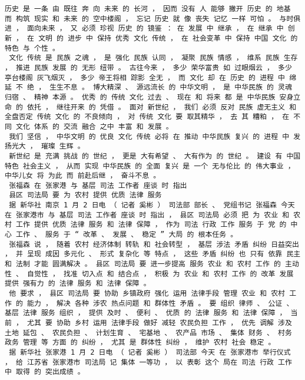\documentclass{article}
\begin{document}
\begin{Verbatim}[commandchars=\\\{\}]
 历史 是 一条 由 既往 奔 向 未来 的 长河 ， 因而 没有 人 能够 撇开 历史 的 地基 而 构筑 现实 和 未来 的 空中楼阁 ， 忘记 历史 就 像 丧失 记忆 一样 可怕 。 与时俱进 ， 面向未来 ， 又 必须 珍视 历史 的 镜鉴 ： 在 发展 中 继承 ， 在 继承 中 创新 ， 在 文明 的 进步 中 保持 优秀 文化 传统 ， 在 社会变革 中 保持 中国 文化 的 特色 与 个性 。 
 文化 传统 是 民族 之魂 ， 是 强化 民族 认同 ， 凝聚 民族 情感 ， 维系 民族 生存 ， 推进 民族 发展 的 无形 纽带 。 古往今来 ， 多少 荣华富贵 如 过眼烟云 ， 多少 亭台楼阁 灰飞烟灭 ， 多少 帝王将相 踪影 全无 ， 而 文化 却 在 历史 的 进程 中 绵延 不 绝 ， 生生不息 。 博大精深 、 源远流长 的 中华文明 ， 是 中华民族 的 灵魂 归宿 、 精神 本源 。 优秀 的 传统 文化 过去 、 现在 和 将来 都 是 中华民族 安身立命 的 依托 ， 继往开来 的 凭借 。 面对 新世纪 ， 我们 必须 反对 民族 虚无主义 和 全盘否定 传统 文化 的 不良倾向 ， 对 传统 文化 要 取其精华 ， 去 其 糟粕 ， 在 不同 文化 体系 的 交流 融合 之中 丰富 和 发展 。 
 我们 坚信 ， 中华文明 的 优良 文化 传统 必将 在 推动 中华民族 复兴 的 进程 中 发扬光大 ， 璀璨 生辉 。 
 新世纪 是 充满 挑战 的 世纪 ， 更是 大有希望 、 大有作为 的 世纪 。 建设 有 中国 特色 社会主义 ， 从而 实现 中华民族 的 全面 复兴 是 一个 无与伦比 的 伟大事业 ， 中华儿女 将 为此 而 前赴后继 ， 奋斗不息 。 
 张福森 在 张家港 与 基层 司法 工作者 座谈 时 指出 
 县区 司法局 要 为 农村 提供 优质 法律 服务 
 据 新华社 南京 1 月 2 日电 （ 记者 奚彬 ） 司法部 部长 、 党组书记 张福森 今天 在 张家港市 与 基层 司法 工作者 座谈 时 指出 ， 县区 司法局 必须 把 为 农业 和 农村 工作 提供 优质 法律 服务 和 法律 保障 ， 作为 司法 行政 工作 服务 于 党 的 中心 工作 、 服务 于 “ 改革 、 发展 、 稳定 ” 大局 的 根本任务 。 
 张福森 说 ， 随着 农村 经济体制 转轨 和 社会转型 ， 基层 涉法 矛盾 纠纷 日益突出 ， 并 呈现 成因 多元化 、 形式 复杂化 等 特点 ， 这些 矛盾 纠纷 也 只有 依靠 民主 和 法制 才能 圆满解决 。 县区 司法局 要 进一步提高 服务 农业 和 农村 工作 的 主动性 、 自觉性 ， 找准 切入点 和 结合点 ， 积极 为 农业 和 农村 工作 的 改革 发展 提供 强有力 的 法律 服务 和 法律 保障 。 
 他 要求 ， 县区 司法局 要 协助 乡镇政府 强化 运用 法律手段 管理 农业 和 农村 工作 的 能力 ， 解决 各种 涉农 热点问题 和 群体性 矛盾 。 要 组织 律师 、 公证 、 基层 法律 服务 组织 ， 提供 及时 、 便利 、 优质 的 法律 服务 和 法律 保障 ， 当前 ， 尤其 要 协助 乡村 运用 法律手段 做好 减轻 农民负担 工作 ， 优先 调解 涉及 土地 延包 、 农民负担 、 计划生育 、 宅基地 、 农产品 市场 、 集体 财务 、 村务 政务 管理 等 方面 的 纠纷 ， 尤其 是 群体性 纠纷 ， 维护 农村 社会 稳定 。 
 据 新华社 张家港 1 月 2 日电 （ 记者 奚彬 ） 司法部 今天 在 张家港市 举行仪式 ， 给 江苏省 张家港市 司法局 记 集体 一等功 ， 以 表彰 这个 局在 司法 行政 工作 中 取得 的 突出成绩 。 

\end{Verbatim}
\end{document}
